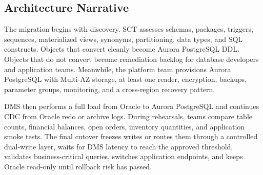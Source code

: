 \subsection{Architecture Narrative}
The migration begins with discovery. SCT assesses schemas, packages, triggers, sequences, materialized views, synonyms, partitioning, data types, and SQL constructs. Objects that convert cleanly become Aurora PostgreSQL DDL. Objects that do not convert become remediation backlog for database developers and application teams. Meanwhile, the platform team provisions Aurora PostgreSQL with Multi-AZ storage, at least one reader, encryption, backups, parameter groups, monitoring, and a cross-region recovery pattern.

DMS then performs a full load from Oracle to Aurora PostgreSQL and continues CDC from Oracle redo or archive logs. During rehearsals, teams compare table counts, financial balances, open orders, inventory quantities, and application smoke tests. The final cutover freezes writes or routes them through a controlled dual-write layer, waits for DMS latency to reach the approved threshold, validates business-critical queries, switches application endpoints, and keeps Oracle read-only until rollback risk has passed.

